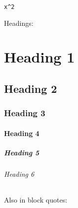 \begin{tcolorbox}[toptitle=-1mm,bottomtitle=1mm,colback=admonition-default!50!white,colframe=admonition-default,title=\textbf{Blocks in block context}]

\begin{lstlisting}[]
x^2
\end{lstlisting}

Headings:

\chapter{Heading 1}

\section{Heading 2}

\subsection{Heading 3}

\subsubsection{Heading 4}

\paragraph{Heading 5}\indent

\subparagraph{Heading 6}\indent

\end{tcolorbox}


Also in block quotes:



